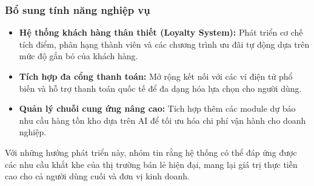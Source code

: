 \subsubsection{Bổ sung tính năng nghiệp vụ}
\begin{itemize}
    \item \textbf{Hệ thống khách hàng thân thiết (Loyalty System):} Phát triển cơ chế tích điểm, phân hạng thành viên và các chương trình ưu đãi tự động dựa trên mức độ gắn bó của khách hàng.
    \item \textbf{Tích hợp đa cổng thanh toán:} Mở rộng kết nối với các ví điện tử phổ biến và hỗ trợ thanh toán quốc tế để đa dạng hóa lựa chọn cho người dùng.
    \item \textbf{Quản lý chuỗi cung ứng nâng cao:} Tích hợp thêm các module dự báo nhu cầu hàng tồn kho dựa trên AI để tối ưu hóa chi phí vận hành cho doanh nghiệp.
\end{itemize}

\vspace{10pt}
Với những hướng phát triển này, nhóm tin rằng hệ thống có thể đáp ứng được các nhu cầu khắt khe của thị trường bán lẻ hiện đại, mang lại giá trị thực tiễn cao cho cả người dùng cuối và đơn vị kinh doanh.
